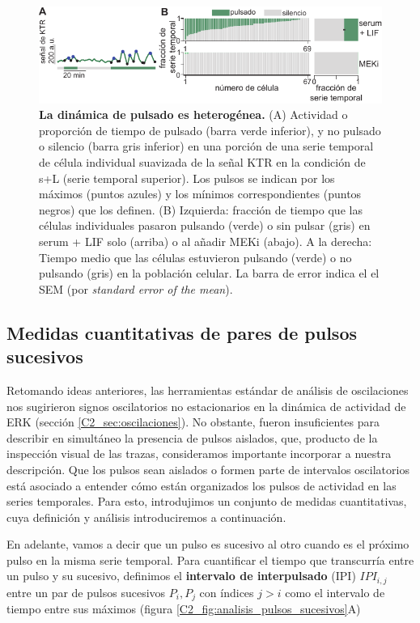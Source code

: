 \documentclass[./main.tex]{subfiles}
\begin{document}
 \begin{figure}
    \centering
    \includegraphics[width=1\textwidth]{figures/chapter2/C2_activity.pdf} 
    \caption{\textbf{La dinámica de pulsado es heterogénea.} (A) Actividad o proporción de tiempo de pulsado (barra verde inferior), y no pulsado o silencio (barra gris inferior) en una porción de una serie temporal de célula individual suavizada de la señal KTR en la condición de s+L (serie temporal superior). Los pulsos se indican por los máximos (puntos azules) y los mínimos correspondientes (puntos negros) que los definen. (B) Izquierda: fracción de tiempo que las células individuales pasaron pulsando (verde) o sin pulsar (gris) en serum + LIF solo (arriba) o al añadir MEKi (abajo). A la derecha: Tiempo medio que las células estuvieron pulsando (verde) o no pulsando (gris) en la población celular. La barra de error indica el el SEM (por \textit{standard error of the mean}).}
    \label{C2_fig:actividad}
\end{figure}


 \subsection{Medidas cuantitativas de pares de pulsos sucesivos}

Retomando ideas anteriores, las herramientas estándar de análisis de oscilaciones nos sugirieron signos oscilatorios no estacionarios en la dinámica de actividad de ERK (sección \ref{C2_sec:oscilaciones}). No obstante, fueron insuficientes para describir en simultáneo la presencia de pulsos aislados, que, producto de la inspección visual de las trazas, consideramos importante incorporar a nuestra descripción. Que los pulsos sean aislados o formen parte de intervalos oscilatorios está asociado a entender cómo están organizados los pulsos de actividad en las series temporales. Para esto, introdujimos un conjunto de medidas cuantitativas, cuya definición y análisis introduciremos a continuación.


En adelante, vamos a decir que  un pulso es sucesivo al otro cuando es el próximo pulso en la misma serie temporal. Para cuantificar el tiempo que transcurría entre un pulso y su sucesivo, definimos el \textbf{intervalo de interpulsado} (IPI) $IPI_{i,j}$ entre un par de pulsos sucesivos $P_i, P_j$ con índices $j >i$ como el intervalo de tiempo entre sus máximos (figura \ref{C2_fig:analisis_pulsos_sucesivos}A)  
\end{document}
